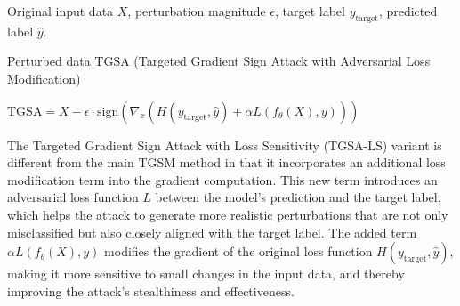 Original input data $X$, perturbation magnitude $\epsilon$, target label $y_{\text{target}}$, predicted label $\hat{y}$.

Perturbed data $\text{TGSA}$ (Targeted Gradient Sign Attack with Adversarial Loss Modification)

$\text{TGSA} = X - \epsilon \cdot \text{sign} \left( \nabla_x (H(y_{\text{target}}, \hat{y}) + \alpha L(f_\theta(X), y)) \right)$

The Targeted Gradient Sign Attack with Loss Sensitivity (TGSA-LS) variant is different from the main TGSM method in that it incorporates an additional loss modification term into the gradient computation. This new term introduces an adversarial loss function $L$ between the model's prediction and the target label, which helps the attack to generate more realistic perturbations that are not only misclassified but also closely aligned with the target label. The added term $\alpha L(f_\theta(X), y)$ modifies the gradient of the original loss function $H(y_{\text{target}}, \hat{y})$, making it more sensitive to small changes in the input data, and thereby improving the attack's stealthiness and effectiveness.